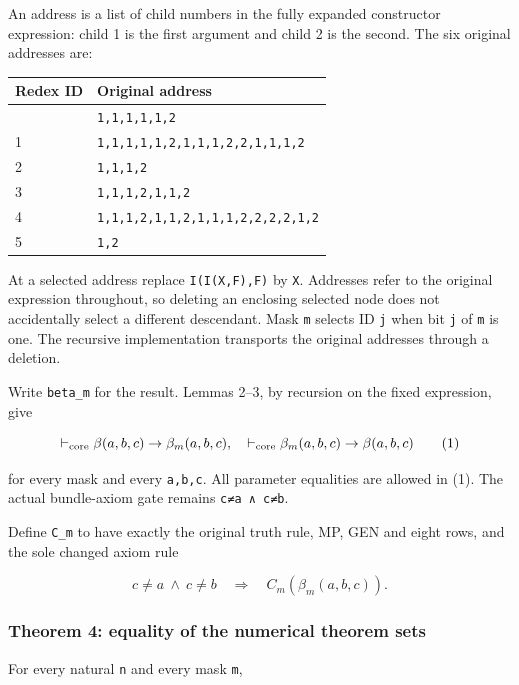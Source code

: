 An address is a list of child numbers in the fully expanded constructor
expression: child 1 is the first argument and child 2 is the second. The
six original addresses are:

\begin{longtable}[]{@{}ll@{}}
\toprule\noalign{}
Redex ID & Original address \\
\midrule\noalign{}
\endhead
\bottomrule\noalign{}
\endlastfoot
0 & \texttt{1,1,1,1,1,2} \\
1 & \texttt{1,1,1,1,1,2,1,1,1,2,2,1,1,1,2} \\
2 & \texttt{1,1,1,2} \\
3 & \texttt{1,1,1,2,1,1,2} \\
4 & \texttt{1,1,1,2,1,1,2,1,1,1,2,2,2,2,1,2} \\
5 & \texttt{1,2} \\
\end{longtable}

At a selected address replace \texttt{I(I(X,F),F)} by \texttt{X}.
Addresses refer to the original expression throughout, so deleting an
enclosing selected node does not accidentally select a different
descendant. Mask \texttt{m} selects ID \texttt{j} when bit \texttt{j} of
\texttt{m} is one. The recursive implementation transports the original
addresses through a deletion.

Write \texttt{beta\_m} for the result. Lemmas 2--3, by recursion on the
fixed expression, give

\[
\vdash_{\rm core}\beta(a,b,c)\to\beta_m(a,b,c),
\quad
\vdash_{\rm core}\beta_m(a,b,c)\to\beta(a,b,c)
\tag{1}
\]

for every mask and every \texttt{a,b,c}. All parameter equalities are
allowed in (1). The actual bundle-axiom gate remains
\texttt{c≠a\ ∧\ c≠b}.

Define \texttt{C\_m} to have exactly the original truth rule, MP, GEN
and eight rows, and the sole changed axiom rule

\[
c\ne a\ \land\ c\ne b\quad\Longrightarrow\quad C_m(\beta_m(a,b,c)).
\]

\hypertarget{theorem-4-equality-of-the-numerical-theorem-sets}{%
\subsubsection{Theorem 4: equality of the numerical theorem
sets}\label{theorem-4-equality-of-the-numerical-theorem-sets}}

For every natural \texttt{n} and every mask \texttt{m},

